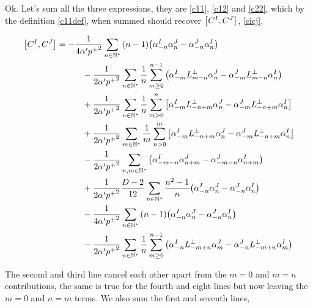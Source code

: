 Ok. Let's sum all the three expressions, they are \ref{c11}, \ref{c12} and \ref{c22}, which by the definition \ref{c11def}, when summed should recover $\comm{C^I}{C^J}$, \ref{cicj},

\begin{align*}
    \comm{C^{I}}{C^{J}}&=-\frac{1}{4\alpha'{p^+}^2}\sum\limits_{n\in\mathbb N^\ast}\qty(n-1)\qty(\alpha^I_{-n}\alpha^J_n-\alpha^J_{-n}\alpha^I_n)\\
    &\quad\quad\quad-\frac{1}{2\alpha'{p^+}^2}\sum\limits_{n\in\mathbb N^\ast}\frac{1}{n}\sum\limits_{m\geq0}^{n-1}\qty(\alpha_{-m}^IL^\perp_{m-n}\alpha^J_n-\alpha^J_{-m}L^\perp_{m-n}\alpha^I_n)\\
    &\quad\quad\quad+\frac{1}{2\alpha'{p^+}^2}\sum\limits_{n\in\mathbb N^\ast}\frac1n\sum\limits_{m>0}^n\qty[\alpha^I_{-m}L^\perp_{-n+m}\alpha_n^J-\alpha^J_{-m}L^\perp_{-n+m}\alpha_n^I]\\
    &\quad\quad\quad+\frac{1}{2\alpha'{p^+}^2}\sum\limits_{m\in\mathbb N^\ast}\frac1m\sum\limits_{n>0}^m\qty[\alpha^I_{-m}L^\perp_{-n+m}\alpha_n^J-\alpha^J_{-m}L^\perp_{-n+m}\alpha_n^I]\\
    &\quad\quad\quad-\frac{1}{2\alpha'{p^+}^2}\sum\limits_{n,m\in\mathbb N^\ast}\left(\alpha^I_{-m-n}\alpha^J_{n+m}-\alpha^J_{-m-n}\alpha^I_{n+m}\right)\\
    &\quad\quad\quad+\frac{1}{2\alpha'{p^+}^2}\frac{D-2}{12}\sum\limits_{n\in\mathbb N^\ast}\frac{n^2-1}{n}\qty(\alpha^I_{-n}\alpha_n^J-\alpha^J_{-n}\alpha_n^I)\\
    &\quad\quad\quad-\frac{1}{4\alpha'{p^+}^2}\sum\limits_{n\in\mathbb N^\ast}\qty(n-1)\qty(\alpha_{-n}^I\alpha^J_{n}-\alpha_{-n}^J\alpha^I_n)\\
    &\quad\quad\quad-\frac{1}{2\alpha'{p^+}^2}\sum\limits_{n\in\mathbb N^\ast}\frac{1}{n}\sum\limits_{m\geq0}^{n-1}\qty(\alpha_{-n}^IL^\perp_{-m+n}\alpha^J_{m}-\alpha_{-n}^JL^\perp_{-m+n}\alpha^I_{m})
\end{align*}

The second and third line cancel each other apart from the $m=0$ and $m=n$ contributions, the same is true for the fourth and eight lines but now leaving the $m=0$ and $n=m$ terms. We also sum the 
first and seventh lines,

